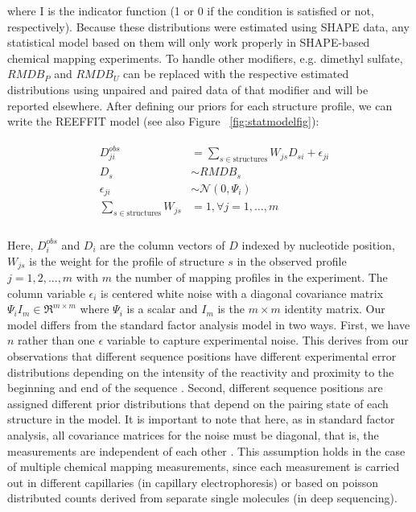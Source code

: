\documentclass[12pt]{article}
\begin{document}
where $\mbox{I}$ is the indicator function (1 or 0 if the condition is satisfied or not, respectively). Because these distributions were estimated using SHAPE data, any statistical model based on them will only work properly in SHAPE-based chemical mapping experiments. 
To handle other modifiers, e.g. dimethyl sulfate, $RMDB_P$ and $RMDB_U$ can be replaced with the respective estimated distributions using unpaired and paired data of that modifier \cite{Cordero2012a} and will be reported elsewhere. 
After defining our priors for each structure profile, we can write the REEFFIT model (see also Figure ~\ref{fig:statmodelfig}):

\begin{align}
  &\begin{aligned}\label{reeffit_model}
    D^{obs}_{ji} &= \sum_{s \in \mbox{structures}} W_{js}D_{si} + \epsilon_{ji}\\
    D_{s} &\sim RMDB_{s} \\
    \epsilon_{ji} &\sim \mathcal{N}(0, \Psi_{i}) \\
    \sum_{s \in \mbox{structures}} W_{js} &= 1, \forall j = 1, …, m\\
  \end{aligned}
\end{align}


Here, $D^{obs}_{i}$ and $D_{i}$ are the column vectors of $D$ indexed by nucleotide position, $W_{js}$ is the weight for the profile of structure $s$ in the observed profile $j = 1 , 2, ..., m$ with $m$ the number of mapping profiles in the experiment. 
The column variable $\epsilon_{i}$ is centered white noise with a diagonal covariance matrix $\Psi_{i}I_{m} \in \Re^{m \times m}$ where $\Psi_{i}$ is a scalar and $I_{m}$ is the $m \times m$ identity matrix. 
Our model differs from the standard factor analysis model \cite{Ghahramani1996} in two ways. 
First, we have $n$ rather than one $\epsilon$ variable to capture experimental noise. 
This derives from our observations that different sequence positions have different experimental error distributions depending on the intensity of the reactivity and proximity to the beginning and end of the sequence \cite{Kladwang2011}. 
Second, different sequence positions are assigned different prior distributions that depend on the pairing state of each structure in the model. 
It is important to note that here, as in standard factor analysis, all covariance matrices for the noise must be diagonal, that is, the measurements are independent of each other \cite{Ghahramani1996,Rubin1982}. 
This assumption holds in the case of multiple chemical mapping measurements, since each measurement is carried out in different capillaries (in capillary electrophoresis) or based on poisson distributed counts derived from separate single molecules (in deep sequencing).
\end{document}
